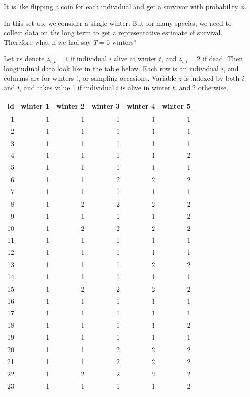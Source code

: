 \documentclass[
  12pt,
]{krantz}
\begin{document}
It is like flipping a coin for each individual and get a survivor with probability \(\phi\).

In this set up, we consider a single winter. But for many species, we need to collect data on the long term to get a representative estimate of survival. Therefore what if we had say \(T = 5\) winters?

Let us denote \(z_{i,t} = 1\) if individual \(i\) alive at winter \(t\), and \(z_{i,t} = 2\) if dead. Then longitudinal data look like in the table below. Each row is an individual \(i\), and columns are for winters \(t\), or sampling occasions. Variable \(z\) is indexed by both \(i\) and \(t\), and takes value 1 if individual \(i\) is alive in winter \(t\), and 2 otherwise.

\begin{tabular}{r|r|r|r|r|r}
\hline
id & winter 1 & winter 2 & winter 3 & winter 4 & winter 5\\
\hline
1 & 1 & 1 & 1 & 1 & 1\\
\hline
2 & 1 & 1 & 1 & 1 & 1\\
\hline
3 & 1 & 1 & 1 & 1 & 1\\
\hline
4 & 1 & 1 & 1 & 1 & 2\\
\hline
5 & 1 & 1 & 1 & 1 & 1\\
\hline
6 & 1 & 1 & 2 & 2 & 2\\
\hline
7 & 1 & 1 & 1 & 1 & 1\\
\hline
8 & 1 & 2 & 2 & 2 & 2\\
\hline
9 & 1 & 1 & 1 & 1 & 2\\
\hline
10 & 1 & 2 & 2 & 2 & 2\\
\hline
11 & 1 & 1 & 1 & 1 & 1\\
\hline
12 & 1 & 1 & 1 & 1 & 1\\
\hline
13 & 1 & 1 & 1 & 2 & 2\\
\hline
14 & 1 & 1 & 1 & 1 & 1\\
\hline
15 & 1 & 2 & 2 & 2 & 2\\
\hline
16 & 1 & 1 & 1 & 1 & 1\\
\hline
17 & 1 & 1 & 1 & 1 & 1\\
\hline
18 & 1 & 1 & 1 & 1 & 2\\
\hline
19 & 1 & 1 & 1 & 1 & 1\\
\hline
20 & 1 & 1 & 2 & 2 & 2\\
\hline
21 & 1 & 1 & 2 & 2 & 2\\
\hline
22 & 1 & 2 & 2 & 2 & 2\\
\hline
23 & 1 & 1 & 1 & 1 & 2\\

\end{tabular}
\end{document}
